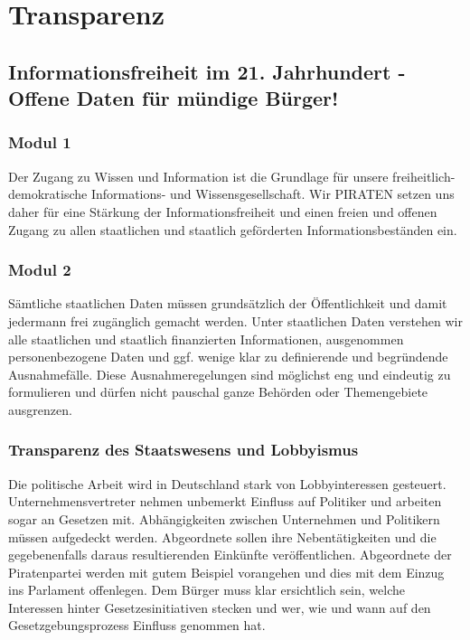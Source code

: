 \section{Transparenz}
\subsection*{Informationsfreiheit im 21. Jahrhundert - Offene Daten für mündige Bürger!}

\label{transparenz:daten}
\subsubsection{Modul 1}
\abstimmung
Der Zugang zu Wissen und Information ist die Grundlage für unsere freiheitlich-demokratische Informations- und Wissensgesellschaft. Wir PIRATEN setzen uns daher für eine Stärkung der Informationsfreiheit und einen freien und offenen Zugang zu allen staatlichen und staatlich geförderten Informationsbeständen ein.

\subsubsection{Modul 2}
\abstimmung
Sämtliche staatlichen Daten müssen grundsätzlich der Öffentlichkeit und damit jedermann frei zugänglich gemacht werden. Unter staatlichen Daten verstehen wir alle staatlichen und staatlich finanzierten Informationen, ausgenommen personenbezogene Daten und ggf. wenige klar zu definierende und begründende Ausnahmefälle. Diese Ausnahmeregelungen sind möglichst eng und eindeutig zu formulieren und dürfen nicht pauschal ganze Behörden oder Themengebiete ausgrenzen.
 
\subsubsection{Transparenz des Staatswesens und Lobbyismus}
\abstimmung
Die politische Arbeit wird in Deutschland stark von Lobbyinteressen gesteuert. Unternehmensvertreter nehmen unbemerkt Einfluss auf Politiker und arbeiten sogar an Gesetzen mit. Abhängigkeiten zwischen Unternehmen und Politikern müssen aufgedeckt werden. Abgeordnete sollen ihre Nebentätigkeiten und die gegebenenfalls daraus resultierenden Einkünfte veröffentlichen. Abgeordnete der Piratenpartei werden mit gutem Beispiel vorangehen und dies mit dem Einzug ins Parlament offenlegen. Dem Bürger muss klar ersichtlich sein, welche Interessen hinter Gesetzesinitiativen stecken und wer, wie und wann auf den Gesetzgebungsprozess Einfluss genommen hat.

